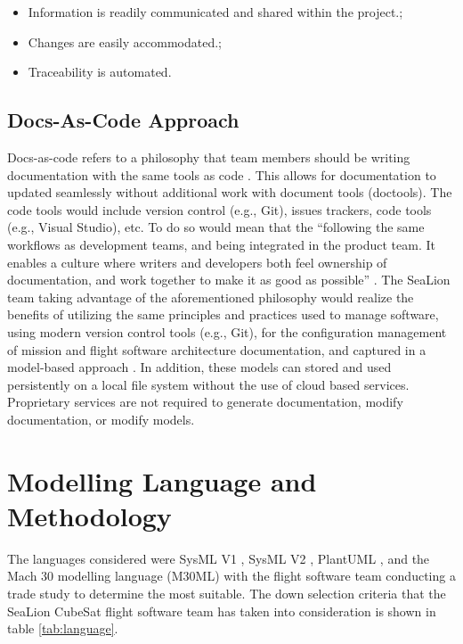\documentclass[journal,article,submit,pdftex,moreauthors]{Definitions/mdpi}
\begin{document}
\begin{itemize}
	\item	Information is readily communicated and shared within the project.;
	\item	Changes are easily accommodated.;
	\item	Traceability is automated.
\end{itemize}

\subsection{Docs-As-Code Approach}
Docs-as-code refers to a philosophy that team members should be writing documentation with the same tools as code \cite{ibm_mbse}.  This allows for documentation to updated seamlessly without additional work with document tools (doctools).  The code tools would include version control (e.g., Git), issues trackers, code tools (e.g., Visual Studio), etc.  To do so would mean that the “following the same workflows as development teams, and being integrated in the product team. It enables a culture where writers and developers both feel ownership of documentation, and work together to make it as good as possible” \cite{ibm_mbse}.  The SeaLion team taking advantage of the aforementioned philosophy would realize the benefits of utilizing the same principles and practices used to manage software, using modern version control tools (e.g., Git), for the configuration management of mission and flight software architecture documentation, and captured in a model-based approach \cite{ibm_mbse}.  In addition, these models can stored and used persistently on a local file system without the use of cloud based services.  Proprietary services are not required to generate documentation, modify documentation, or modify models.

\section{Modelling Language and Methodology}
The languages considered were SysML V1 \cite{sys_ml}, SysML V2 \cite{sys_ml2}, PlantUML \cite{plantuml}, and the Mach 30 modelling language (M30ML) \cite{mach30_git} with the flight software team conducting a trade study to determine the most suitable.  The down selection criteria that the SeaLion CubeSat flight software team has taken into consideration is shown in table \ref{tab:language}.
\end{document}
